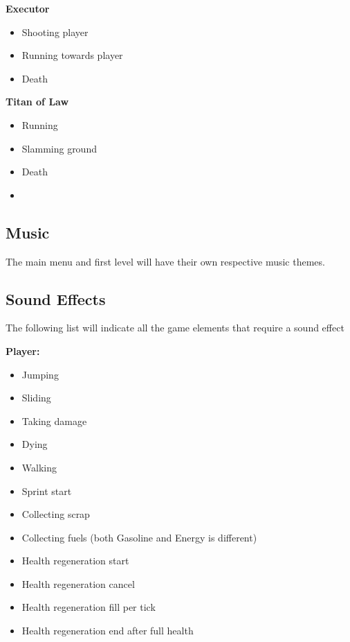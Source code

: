 \documentclass[../Main.tex]{subfiles}
\begin{document}
\textbf{Executor}
\begin{itemize}
	\item Shooting player
	\item Running towards player
	\item Death
\end{itemize}

\textbf{Titan of Law}
\begin{itemize}
	\item Running
	\item Slamming ground
	\item Death
\end{itemize}

\textbf{}
\begin{itemize}
	\item 
\end{itemize}

\subsection{Music}

The main menu and first level will have their own respective music themes. 

\subsection{Sound Effects}

The following list will indicate all the game elements that require a sound effect\newline

\textbf{Player:}
\begin{itemize}
	\item Jumping
	\item Sliding
	\item Taking damage
	\item Dying
	\item Walking
	\item Sprint start
	\item Collecting scrap
	\item Collecting fuels (both Gasoline and Energy is different)
	\item Health regeneration start
	\item Health regeneration cancel
	\item Health regeneration fill per tick
	\item Health regeneration end after full health
\end{itemize}
\end{document}

